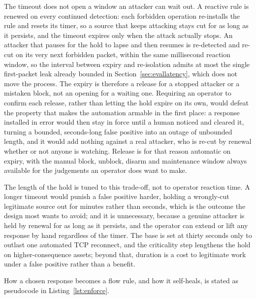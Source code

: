 The timeout does not open a window an attacker can wait out. A reactive rule is renewed on every continued detection: each forbidden operation re-installs the rule and resets its timer, so a source that keeps attacking stays cut for as long as it persists, and the timeout expires only when the attack actually stops. An attacker that pauses for the hold to lapse and then resumes is re-detected and re-cut on its very next forbidden packet, within the same millisecond reaction window, so the interval between expiry and re-isolation admits at most the single first-packet leak already bounded in Section~\ref{sec:evallatency}, which does not move the process. The expiry is therefore a release for a stopped attacker or a mistaken block, not an opening for a waiting one. Requiring an operator to confirm each release, rather than letting the hold expire on its own, would defeat the property that makes the automation armable in the first place: a response installed in error would then stay in force until a human noticed and cleared it, turning a bounded, seconds-long false positive into an outage of unbounded length, and it would add nothing against a real attacker, who is re-cut by renewal whether or not anyone is watching. Release is for that reason automatic on expiry, with the manual block, unblock, disarm and maintenance window always available for the judgements an operator does want to make.

The length of the hold is tuned to this trade-off, not to operator reaction time. A longer timeout would punish a false positive harder, holding a wrongly-cut legitimate source out for minutes rather than seconds, which is the outcome the design most wants to avoid; and it is unnecessary, because a genuine attacker is held by renewal for as long as it persists, and the operator can extend or lift any response by hand regardless of the timer. The base is set at thirty seconds only to outlast one automated TCP reconnect, and the criticality step lengthens the hold on higher-consequence assets; beyond that, duration is a cost to legitimate work under a false positive rather than a benefit.

How a chosen response becomes a flow rule, and how it self-heals, is stated as pseudocode in Listing~\ref{lst:enforce}.


